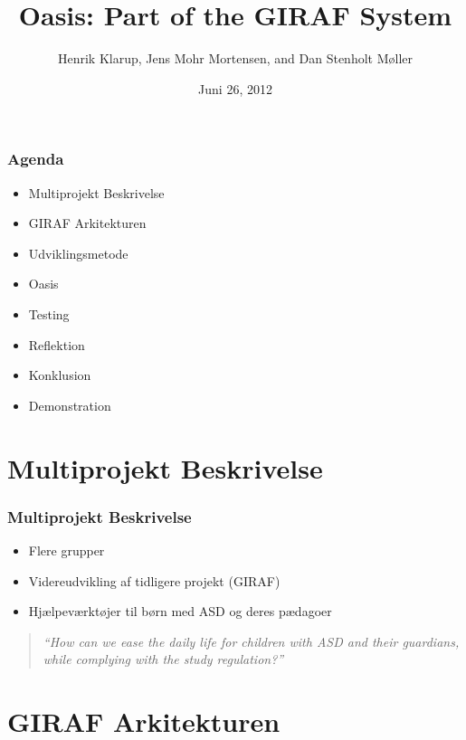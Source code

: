 \documentclass{beamer}
\title{Oasis: Part of the GIRAF System}
\author{Henrik Klarup, Jens Mohr Mortensen, and Dan Stenholt M\o{}ller}
\institute[AAU]{Aalborg University}
\date{Juni 26, 2012}
\begin{document}
\begin{frame}
	\titlepage
\end{frame}

\begin{frame}
	\frametitle{Agenda}
	\begin{itemize}
		\item Multiprojekt Beskrivelse
		\item GIRAF Arkitekturen
		\item Udviklingsmetode
		\item Oasis
		\item Testing
		\item Reflektion
		\item Konklusion
		\item Demonstration
	\end{itemize}
\end{frame}

\section{Multiprojekt Beskrivelse}

\begin{frame}
	\frametitle{Multiprojekt Beskrivelse}
	\begin{itemize}
		\item Flere grupper
		\item Videreudvikling af tidligere projekt (GIRAF)
		\item Hj\ae{}lpev\ae{}rkt\o{}jer til b\o{}rn med ASD og deres p\ae{}dagoer
	\end{itemize}
	\begin{quote}
		\textit{``How can we ease the daily life for children with ASD and their guardians, while complying with the study regulation?''}
	\end{quote}
\end{frame}

\section{GIRAF Arkitekturen}
\end{document}
